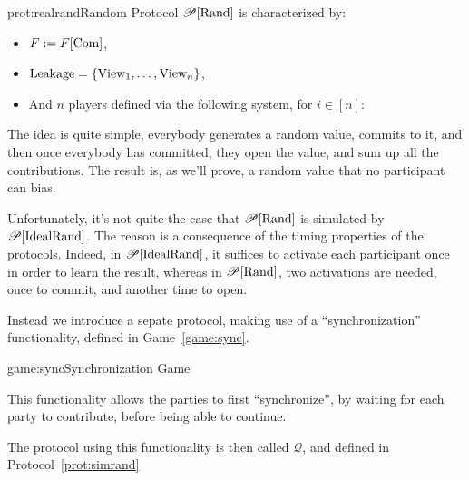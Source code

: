 \begin{protocol}{prot:realrand}{Random Protocol}
$\mathscr{P}[\text{Rand}]$ is characterized by:
\begin{itemize}
    \item $F := F[\text{Com}]$,
    \item $\text{Leakage} = \{\text{View}_1, \ldots, \text{View}_n\}$,
    \item And $n$ players defined via the following system, for $i \in [n]$:
\end{itemize}
\end{protocol}

The idea is quite simple, everybody generates a random value,
commits to it, and then once everybody has committed, they open the value,
and sum up all the contributions.
The result is, as we'll prove, a random value that no participant
can bias.

Unfortunately, it's not quite the case that $\mathscr{P}[\text{Rand}]$
is simulated by $\mathscr{P}[\text{IdealRand}]$.
The reason is a consequence of the timing properties
of the protocols.
Indeed, in $\mathscr{P}[\text{IdealRand}]$, it suffices to activate
each participant once in order to learn the result,
whereas in $\mathscr{P}[\text{Rand}]$, two activations are needed,
once to commit, and another time to open.

Instead we introduce a sepate protocol, making use of
a ``synchronization'' functionality, defined in Game~\ref{game:sync}.

\begin{game}{game:sync}{Synchronization Game}
\end{game}

This functionality allows the parties to first ``synchronize'',
by waiting for each party to contribute, before being able to continue.

The protocol using this functionality is then called $\mathscr{Q}$,
and defined in Protocol~\ref{prot:simrand}

